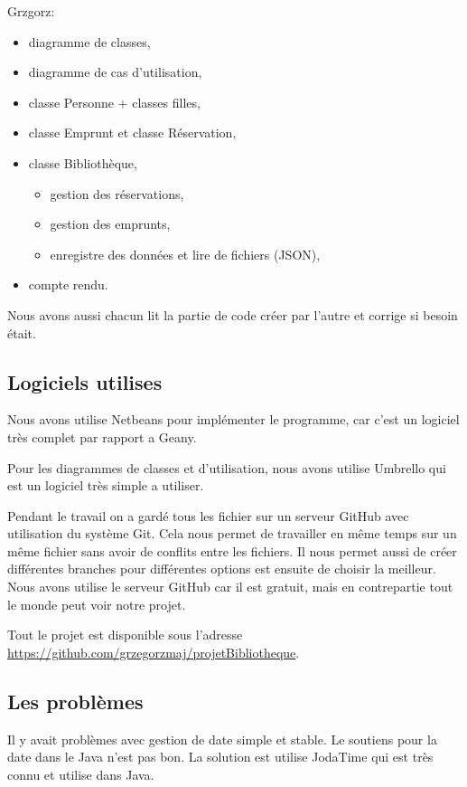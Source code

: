 \documentclass[10pt, a4paper]{article}
\begin{document}
		
		Grzgorz:
		\begin{itemize}
			\item diagramme de classes,
			\item diagramme de cas d'utilisation,			
			\item classe Personne + classes filles,
			\item classe Emprunt et classe Réservation,
			\item classe Bibliothèque,
			\begin{itemize}
				\item gestion des réservations,
				\item gestion des emprunts,
				\item enregistre des données et lire de fichiers (JSON),
			\end{itemize}
			\item compte rendu.
		\end{itemize}
		
		Nous avons aussi chacun lit la partie de code créer par l'autre et corrige si besoin était.
		
		
		
		
		\subsection{Logiciels utilises}
		Nous avons utilise Netbeans pour implémenter le programme, car c'est un logiciel très complet par 
		rapport a Geany.

		Pour les diagrammes de classes et d'utilisation, nous avons utilise Umbrello qui est un logiciel 	
		très simple a utiliser.
		
		Pendant le travail on a gardé tous les fichier sur un serveur GitHub avec utilisation du système 
		Git. Cela nous permet de travailler en même temps sur un même fichier sans avoir de conflits entre 
		les fichiers. Il nous permet aussi de créer différentes branches pour différentes options est 
		ensuite de choisir la meilleur. Nous avons utilise le serveur GitHub car il est gratuit, mais en 
		contrepartie tout le monde peut voir notre projet.
		
		Tout le projet est disponible sous l'adresse
		\url{https://github.com/grzegorzmaj/projetBibliotheque}.
		
		\subsection{Les problèmes}
		Il y avait problèmes avec gestion de date simple et stable. Le soutiens pour la date dans le Java 
		n'est pas bon. La solution est utilise JodaTime qui est très connu et utilise dans Java.
		
	


\end{document}
